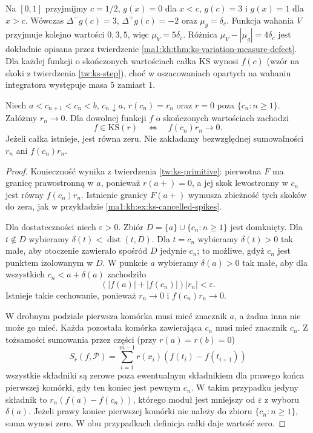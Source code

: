 \begin{przyklad}\label{ma1:kh:ex:ks-variation-defect}
Na $[0,1]$ przyjmijmy $c=1/2$, $g(x)=0$ dla $x<c$, $g(c)=3$ i $g(x)=1$ dla $x>c$. Wówczas $\Delta^-g(c)=3$, $\Delta^+g(c)=-2$ oraz $\mu_g=\delta_c$. Funkcja wahania $V$ przyjmuje kolejno wartości $0,3,5$, więc $\mu_V=5\delta_c$. Różnica $\mu_V-|\mu_g|=4\delta_c$ jest dokładnie opisana przez twierdzenie \ref{ma1:kh:thm:ks-variation-measure-defect}. Dla każdej funkcji o skończonych wartościach całka KS wynosi $f(c)$ (wzór na skoki z twierdzenia \ref{tw:ks-step}), choć w oszacowaniach opartych na wahaniu integratora występuje masa $5$ zamiast $1$.
\end{przyklad}
\begin{twierdzenie}\label{ma1:kh:thm:ks-discrete-spikes}
Niech $a<c_{n+1}<c_n<b$, $c_n\downarrow a$, $r(c_n)=r_n$ oraz $r=0$ poza $\{c_n:n\ge1\}$. Załóżmy $r_n\to0$. Dla dowolnej funkcji $f$ o skończonych wartościach zachodzi
\[
 f\in\mathrm{KS}(r)\quad\Longleftrightarrow\quad
 f(c_n)r_n\longrightarrow0.
\]
Jeżeli całka istnieje, jest równa zeru. Nie zakładamy bezwzględnej sumowalności $r_n$ ani $f(c_n)r_n$.
\end{twierdzenie}
\begin{proof}
Konieczność wynika z twierdzenia \ref{tw:ks-primitive}: pierwotna $F$ ma granicę prawostronną w $a$, ponieważ $r(a+)=0$, a jej skok lewostronny w $c_n$ jest równy $f(c_n)r_n$. Istnienie granicy $F(a+)$ wymusza zbieżność tych skoków do zera, jak w przykładzie \ref{ma1:kh:ex:ks-cancelled-spikes}.

Dla dostateczności niech $\varepsilon>0$. Zbiór $D=\{a\}\cup\{c_n:n\ge1\}$ jest domknięty. Dla $t\notin D$ wybieramy $\delta(t)<\operatorname{dist}(t,D)$. Dla $t=c_n$ wybieramy $\delta(t)>0$ tak małe, aby otoczenie zawierało spośród $D$ jedynie $c_n$; to możliwe, gdyż $c_n$ jest punktem izolowanym w $D$. W punkcie $a$ wybieramy $\delta(a)>0$ tak małe, aby dla wszystkich $c_n<a+\delta(a)$ zachodziło
\[
 (|f(a)|+|f(c_n)|)|r_n|<\varepsilon.
\]
Istnieje takie cechowanie, ponieważ $r_n\to0$ i $f(c_n)r_n\to0$.

W drobnym podziale pierwsza komórka musi mieć znacznik $a$, a żadna inna nie może go mieć. Każda pozostała komórka zawierająca $c_n$ musi mieć znacznik $c_n$. Z tożsamości sumowania przez części (przy $r(a)=r(b)=0$)
\[
 S_r(f,\mathcal P)=\sum_{i=1}^{m-1}r(x_i)(f(t_i)-f(t_{i+1}))
\]
wszystkie składniki są zerowe poza ewentualnym składnikiem dla prawego końca pierwszej komórki, gdy ten koniec jest pewnym $c_n$. W takim przypadku jedyny składnik to $r_n(f(a)-f(c_n))$, którego moduł jest mniejszy od $\varepsilon$ z wyboru $\delta(a)$. Jeżeli prawy koniec pierwszej komórki nie należy do zbioru $\{c_n:n\ge1\}$, suma wynosi zero. W obu przypadkach definicja całki daje wartość zero.
\end{proof}
